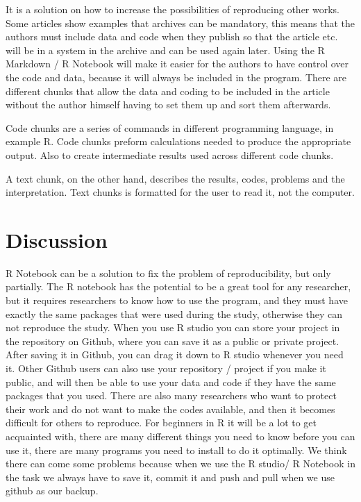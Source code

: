 \documentclass[
  12pt,
]{article}
\begin{document}
It is a solution on how to increase the possibilities of reproducing
other works. Some articles show examples that archives can be mandatory,
this means that the authors must include data and code when they publish
so that the article etc. will be in a system in the archive and can be
used again later. Using the R Markdown / R Notebook will make it easier
for the authors to have control over the code and data, because it will
always be included in the program. There are different chunks that allow
the data and coding to be included in the article without the author
himself having to set them up and sort them afterwards.

Code chunks are a series of commands in different programming language,
in example R. Code chunks preform calculations needed to produce the
appropriate output. Also to create intermediate results used across
different code chunks.

A text chunk, on the other hand, describes the results, codes, problems
and the interpretation. Text chunks is formatted for the user to read
it, not the computer.

\hypertarget{discussion}{%
\section{Discussion}\label{discussion}}

R Notebook can be a solution to fix the problem of reproducibility, but
only partially. The R notebook has the potential to be a great tool for
any researcher, but it requires researchers to know how to use the
program, and they must have exactly the same packages that were used
during the study, otherwise they can not reproduce the study. When you
use R studio you can store your project in the repository on Github,
where you can save it as a public or private project. After saving it in
Github, you can drag it down to R studio whenever you need it. Other
Github users can also use your repository / project if you make it
public, and will then be able to use your data and code if they have the
same packages that you used. There are also many researchers who want to
protect their work and do not want to make the codes available, and then
it becomes difficult for others to reproduce. For beginners in R it will
be a lot to get acquainted with, there are many different things you
need to know before you can use it, there are many programs you need to
install to do it optimally. We think there can come some problems
because when we use the R studio/ R Notebook in the task we always have
to save it, commit it and push and pull when we use github as our
backup.
\end{document}
